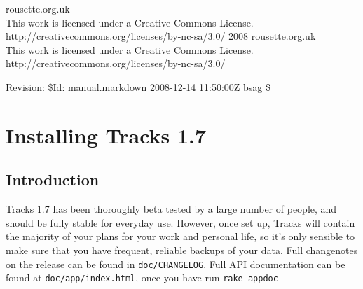 \documentclass[10pt,twoside]{memoir}
\date{2008-12-14}
\title{\mytitle}
\author{\myauthor}
\def\mychapterstyle{BlueBox}
\def\mypagestyle{myruledpagestyle}
\def\revision{}
\def\mycopyright{2008 rousette.org.uk \\ This work is licensed under a Creative Commons License. \\ http://creativecommons.org/licenses/by-nc-sa/3.0/}
\def\revision{Revision: \$Id: manual.markdown 2008-12-14 11:50:00Z bsag \$}
\begin{document}
\chapterstyle{\mychapterstyle}
\pagestyle{\mypagestyle}

%
%

\frontmatter



\maketitle
\clearpage

\vspace*{\fill}

\setlength{\parindent}{0pt}

\ifx\mycopyright\undefined
\else
	\textcopyright{} \mycopyright
\fi

\revision

\begin{center}
\end{center}

\setlength{\parindent}{1em}
\clearpage

\tableofcontents


%
%


\setlength{\parindent}{0pt}
\setlength{\parskip}{\baselineskip/2}

\mainmatter
\chapter{Installing Tracks 1.7}
\label{installingtracks1.7}

\section{Introduction}
\label{introduction}

Tracks 1.7 has been thoroughly beta tested by a large number of people, and should be fully stable for everyday use. However, once set up, Tracks will contain the majority of your plans for your work and personal life, so it's only sensible to make sure that you have frequent, reliable backups of your data. Full changenotes on the release can be found in \texttt{doc/CHANGELOG}. Full API documentation can be found at \texttt{doc/app/index.html}, once you have run \texttt{rake appdoc}
\end{document}
